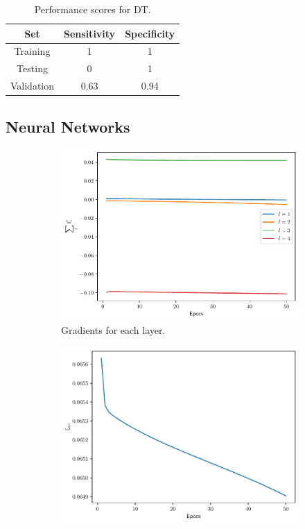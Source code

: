 \documentclass[conference]{IEEEtran}
\theoremstyle{definition}
\theoremstyle{remark}
\theoremstyle{remark}
\begin{document}
\begin{table}
\centering
\caption{Performance scores for DT.}
\label{tab:DT_emb}
\begin{tabular}{ccc}
\hline
\textbf{Set} & \textbf{Sensitivity} & \textbf{Specificity} \\ \hline
Training & 1 & 1 \\
Testing & 0 & 1 \\
Validation & 0.63 & 0.94 \\ \hline
\end{tabular}
\end{table}

\subsection{Neural Networks}
\begin{figure}
    \centering
    \begin{subfigure}[b]{0.32\textwidth}
        \centering
        \includegraphics[width=\textwidth]{figs/2-3-3-0.9-emb-gradients.pdf}
        \caption{Gradients for each layer.}
    \end{subfigure}
    \begin{subfigure}[b]{0.32\textwidth}
        \centering
        \includegraphics[width=\textwidth]{figs/2-3-3-0.9-emb-error.pdf}

\end{subfigure}
\end{figure}
\end{document}
